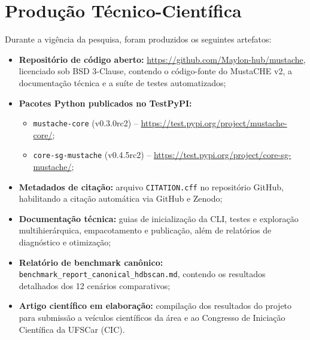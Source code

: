 \documentclass[12pt,a4paper,oneside]{article}
\begin{document}
\printbibliography[heading=bibintoc,title={Referências}]

\section{Produção Técnico-Científica}

Durante a vigência da pesquisa, foram produzidos os seguintes artefatos:

\begin{itemize}
  \item \textbf{Repositório de código aberto:} \url{https://github.com/Maylon-hub/mustache},
        licenciado sob BSD 3-Clause, contendo o código-fonte do MustaCHE v2, a documentação
        técnica e a suíte de testes automatizados;
  \item \textbf{Pacotes Python publicados no TestPyPI:}
        \begin{itemize}
          \item \texttt{mustache-core} (v0.3.0rc2) -- \url{https://test.pypi.org/project/mustache-core/};
          \item \texttt{core-sg-mustache} (v0.4.5rc2) -- \url{https://test.pypi.org/project/core-sg-mustache/};
        \end{itemize}
  \item \textbf{Metadados de citação:} arquivo \texttt{CITATION.cff} no repositório GitHub,
        habilitando a citação automática via GitHub e Zenodo;
  \item \textbf{Documentação técnica:} guias de inicialização da CLI, testes e exploração
        multihierárquica, empacotamento e publicação, além de relatórios de diagnóstico e
        otimização;
  \item \textbf{Relatório de benchmark canônico:} \texttt{benchmark\_report\_canonical\_hdbscan.md},
        contendo os resultados detalhados dos 12 cenários comparativos;
  \item \textbf{Artigo científico em elaboração:} compilação dos resultados do projeto para
        submissão a veículos científicos da área e ao Congresso de Iniciação Científica da
        UFSCar (CIC).
\end{itemize}
\end{document}
